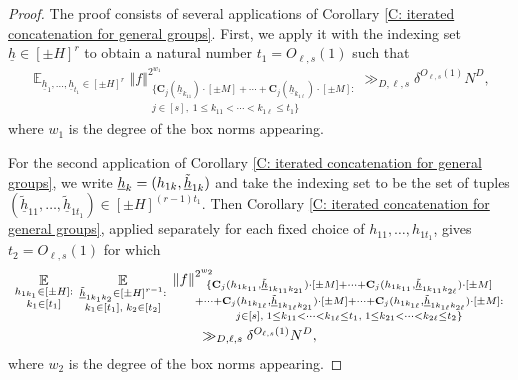 \documentclass[11pt]{amsart}
\theoremstyle{definition}
\DeclareMathOperator*{\E}{\mathbb{E}}
\newcommand{\bc}{{\mathbf{C}}}
\newcommand{\uh}{{\underline{h}}}
\newcommand{\norm}[1]{\left\Vert #1\right\Vert}
\begin{document}
\begin{proof}
    The proof consists of several applications of Corollary \ref{C: iterated concatenation for general groups}. First, we apply it with the indexing set $\uh\in[\pm H]^r$ to obtain a natural number $t_1 = O_{\ell, s}(1)$ such that
    \begin{align*}
        \E_{\uh_1, \ldots, \uh_{t_1}\in[\pm H]^r}\norm{f}_{\substack{\{\bc_j(\uh_{k_{11}})\cdot[\pm M]+\cdots + \bc_j(\uh_{k_{1 \ell}}) \cdot[\pm M]:\\ j\in[s],\; 1\leq k_{11} < \cdots < k_{1 \ell}\leq t_1\}}}^{2^{w_1}}\gg_{D, \ell, s} \delta^{O_{\ell, s}(1)} N^D,
    \end{align*}
    where $w_1$ is the degree of the box norms appearing. 

    For the second application of Corollary \ref{C: iterated concatenation for general groups}, we write $\uh_k = (h_{1k}, \Tilde{\uh}_{1k})$ and take the indexing set to be the set of tuples $(\tilde{\uh}_{11}, \ldots, \tilde{\uh}_{1 t_1})\in[\pm H]^{(r-1)t_1}$. Then Corollary \ref{C: iterated concatenation for general groups}, applied separately for each fixed choice of $h_{11}, \ldots, h_{1t_1}$, gives $t_2 = O_{\ell, s}(1)$ for which
    \begin{multline*}
        \E_{\substack{h_{1k_1}\in[\pm H]:\\ k_1\in[t_1]}}\;
        \E_{\substack{\Tilde{\uh}_{1k_1 k_2}\in[\pm H]^{r-1}:\\ k_1\in [t_1],\; k_2\in[t_2]}}\;
        \norm{f}_{\substack{\{\bc_j(h_{1k_{11}}, \Tilde{\uh}_{1k_{11}k_{21}})\cdot[\pm M]+\cdots + \bc_j(h_{1k_{11}}, \Tilde{\uh}_{1k_{11}k_{2\ell}})\cdot[\pm M]\\
        +\cdots + \bc_j(h_{1k_{1\ell}}, \Tilde{\uh}_{1k_{1\ell}k_{21}})\cdot[\pm M]+\cdots + \bc_j(h_{1k_{1\ell}}, \Tilde{\uh}_{1k_{1\ell}k_{2\ell}})\cdot[\pm M]:\\ j\in[s],\; 1\leq k_{11} < \cdots < k_{1 \ell}\leq t_1,\; 1\leq k_{21} < \cdots < k_{2 \ell}\leq t_2 \}}}^{2^{w_2}}\\ \gg_{D, \ell, s} \delta^{O_{\ell, s}(1)} N^D,
    \end{multline*}
    where $w_2$ is the degree of the box norms appearing.


\end{proof}
\end{document}
